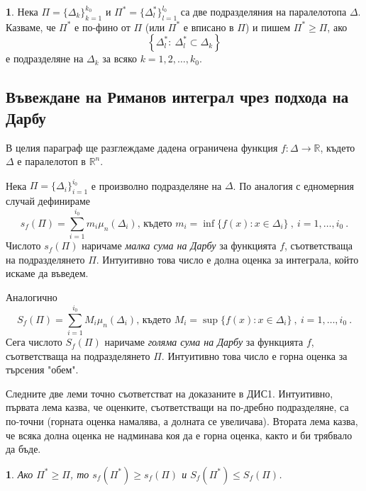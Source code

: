 \documentclass[11pt]{article}
\numberwithin{equation}{section}
\numberwithin{figure}{section}
\numberwithin{table}{section}
\theoremstyle{plain}
\theoremstyle{definition}
\newtheorem{defn}[thm]{\protect\definitionname}
\theoremstyle{remark}
\theoremstyle{definition}
\theoremstyle{remark}
\theoremstyle{plain}
\newtheorem{lem}[thm]{\protect\lemmaname}
\theoremstyle{definition}
\theoremstyle{definition}
\theoremstyle{plain}
\theoremstyle{plain}
\theoremstyle{plain}
\theoremstyle{definition}
\theoremstyle{plain}
\providecommand{\definitionname}{Дефиниция}
\providecommand{\lemmaname}{Лема}
\newcommand*{\R}{\mathbb{R}}
\begin{document}
\begin{defn}
Нека $\Pi = \{\Delta_k \}_{k=1}^{k_0}$ и $\Pi^* = \{\Delta_l^* \}_{l=1}^{l_0}$ са две подразделяния на паралелотопа $\Delta$. Казваме, че $\Pi^*$ е по-фино от $\Pi$ (или $\Pi^*$ е вписано в $\Pi$) и пишем $\Pi^* \ge \Pi$, ако
$$\left\{ \Delta_l^* : \ \Delta_l^* \subset \Delta_k\right\}$$
е подразделяне на $\Delta_k$ за всяко $k=1,2, \dots, k_0$.
\end{defn}

\subsection{Въвеждане на Риманов интеграл чрез подхода на Дарбу}

В целия параграф ще разглеждаме дадена ограничена функция $f:\Delta \rightarrow \R$, където $\Delta$ е паралелотоп в $\R^n$.

 Нека $\Pi = \{\Delta_i \}_{i=1}^{i_0}$ е произволно подразделяне на $\Delta$. По аналогия с едномерния случай дефинираме
$$s_f(\Pi) = \sum_{i=1}^{i_0} m_i \mu_n(\Delta_i)\mbox{, където }m_i = \inf\{f(x) : x\in\Delta_i\} \ , \  i=1, \dots ,i_0 \ .$$
Числото $s_f(\Pi)$ наричаме \textit{малка сума на Дарбу} за функцията $f$, съответстваща на подразделянето $\Pi$. Интуитивно това число е долна оценка за интеграла, който искаме да въведем.

Аналогично
$$S_f(\Pi) = \sum_{i=1}^{i_0} M_i \mu_n(\Delta_i)\mbox{, където }M_i = \sup\{f(x) : x\in\Delta_i\} \ , \  i=1, \dots ,i_0 \ .$$
Сега числото $S_f(\Pi)$ наричаме \textit{голяма сума на Дарбу} за функцията $f$, съответстваща на подразделянето $\Pi$. Интуитивно това число е горна оценка за търсения "обем".

Следните две леми точно съответстват на доказаните в ДИС1. Интуитивно, първата лема казва, че оценките, съответстващи на по-дребно подразделяне, са по-точни (горната оценка намалява, а долната се увеличава). Втората лема казва, че всяка долна оценка не надминава коя да е горна оценка, както и би трябвало да бъде.


\begin{lem}
Ако $\Pi^* \geq \Pi$, то $s_f(\Pi^*)\geq s_f(\Pi)$ и $S_f(\Pi^*)\leq S_f(\Pi)$.
\end{lem}
\end{document}
